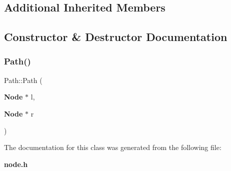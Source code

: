 \subsection*{Additional Inherited Members}


\subsection{Constructor \& Destructor Documentation}
\mbox{\label{class_path_ad508197ffa6676f3017299fab74f25b3}} 
\subsubsection{Path()}
{\footnotesize\ttfamily Path\+::\+Path (\begin{DoxyParamCaption}\item[{\textbf{ Node} $\ast$}]{l,  }\item[{\textbf{ Node} $\ast$}]{r }\end{DoxyParamCaption})\hspace{0.3cm}{\ttfamily [inline]}}



The documentation for this class was generated from the following file\+:\begin{DoxyCompactItemize}
\item 
\textbf{ node.\+h}\end{DoxyCompactItemize}
